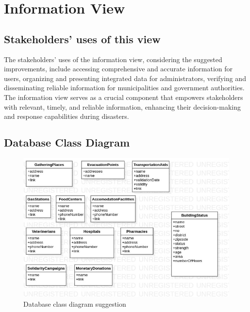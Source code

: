 \documentclass[12pt]{report}
\begin{document}
\section{Information View}

\subsection{Stakeholders' uses of this view}
The stakeholders' uses of the information view, considering the suggested improvements, include accessing comprehensive and accurate information 
for users, organizing and presenting integrated data for administrators, verifying and disseminating reliable information for municipalities and 
government authorities. The information view serves as a crucial component that empowers stakeholders with relevant, timely, and reliable information, 
enhancing their decision-making and response capabilities during disasters.

\subsection{Database Class Diagram}
\begin{figure}[H]
    \includegraphics[scale=0.6]{db2}
    \centering
    \caption{Database class diagram suggestion}
\end{figure}
\end{document}
